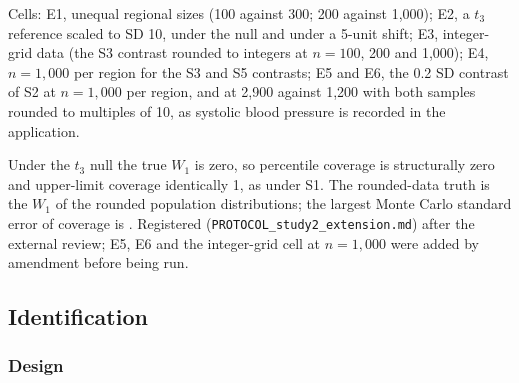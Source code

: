 \documentclass[AMA,Times1COL]{WileyNJDv5}
\begin{document}
\begin{table}[ht]
\centering
\caption{Registered extension of the estimation study: unequal regional sizes, a $t_3$ reference distribution, integer-grid data, $n = 1{,}000$ per region and a 0.2 SD contrast at sample sizes like those of the application. Bias, RMSE and mean width in the original units; coverage of the 95\% percentile interval and of its one-sided 97.5\% upper limit.\label{tab:study2_ext}}
%
\begin{tablenotes}
\item Cells: E1, unequal regional sizes (100 against 300; 200 against 1{,}000); E2, a $t_3$ reference scaled to SD 10, under the null and under a 5-unit shift; E3, integer-grid data (the S3 contrast rounded to integers at $n = 100$, 200 and 1{,}000); E4, $n = 1{,}000$ per region for the S3 and S5 contrasts; E5 and E6, the 0.2 SD contrast of S2 at $n = 1{,}000$ per region, and at 2{,}900 against 1{,}200 with both samples rounded to multiples of 10, as systolic blood pressure is recorded in the application.
\item Under the $t_3$ null the true $W_1$ is zero, so percentile coverage is structurally zero and upper-limit coverage identically 1, as under S1. The rounded-data truth is the $W_1$ of the rounded population distributions; the largest Monte Carlo standard error of coverage is . Registered (\texttt{PROTOCOL\_study2\_extension.md}) after the external review; E5, E6 and the integer-grid cell at $n = 1{,}000$ were added by amendment before being run.
\end{tablenotes}
\end{table}





\subsection{Identification}\label{sec:study1}


\subsubsection{Design}\label{sec:study1_design}
\end{document}
